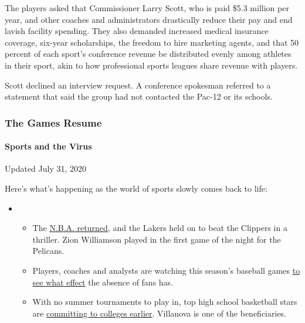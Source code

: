 The players asked that Commissioner Larry Scott, who is paid \$5.3
million per year, and other coaches and administrators drastically
reduce their pay and end lavish facility spending. They also demanded
increased medical insurance coverage, six-year scholarships, the freedom
to hire marketing agents, and that 50 percent of each sport's conference
revenue be distributed evenly among athletes in their sport, akin to how
professional sports leagues share revenue with players.

Scott declined an interview request. A conference spokesman referred to
a statement that said the group had not contacted the Pac-12 or its
schools.

\hypertarget{the-games-resume}{%
\subsubsection{The Games Resume}\label{the-games-resume}}

\hypertarget{sports-and-the-virus}{%
\paragraph{Sports and the Virus}\label{sports-and-the-virus}}

Updated July 31, 2020

Here's what's happening as the world of sports slowly comes back to
life:

\begin{itemize}
\item
  \begin{itemize}
  \tightlist
  \item
    The
    \href{https://www.nytimes3xbfgragh.onion/2020/07/30/sports/basketball/clippers-lakers.html?action=click\&pgtype=Article\&state=default\&region=MAIN_CONTENT_2\&context=storylines_keepup}{N.B.A.
    returned}, and the Lakers held on to beat the Clippers in a
    thriller. Zion Williamson played in the first game of the night for
    the Pelicans.
  \item
    Players, coaches and analysts are watching this season's baseball
    games
    \href{https://www.nytimes3xbfgragh.onion/2020/07/31/sports/baseball/baseball-empty-stadiums-effects.html?action=click\&pgtype=Article\&state=default\&region=MAIN_CONTENT_2\&context=storylines_keepup}{to
    see what effect} the absence of fans has.
  \item
    With no summer tournaments to play in, top high school basketball
    stars are
    \href{https://www.nytimes3xbfgragh.onion/2020/07/30/sports/ncaabasketball/college-basketball-recruiting.html?action=click\&pgtype=Article\&state=default\&region=MAIN_CONTENT_2\&context=storylines_keepup}{committing
    to colleges earlier}. Villanova is one of the beneficiaries.
  \end{itemize}
\end{itemize}

